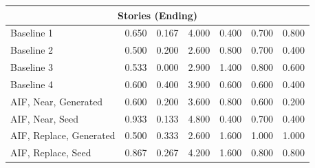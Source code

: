 \begin{table}[!t]
\begin{tabular}{lcccccc}
\midrule
\multicolumn{7}{c}{Stories (Ending)} \\
\midrule
Baseline 1 & 0.650 & 0.167 & 4.000 & 0.400 & 0.700 & 0.800  \\ 
Baseline 2 & 0.500 & 0.200 & 2.600 & 0.800 & 0.700 & 0.400  \\ 
Baseline 3 & 0.533 & 0.000 & 2.900 & 1.400 & 0.800 & 0.600  \\ 
Baseline 4 & 0.600 & 0.400 & 3.900 & 0.600 & 0.600 & 0.400  \\ 
AIF, Near, Generated & 0.600 & 0.200 & 3.600 & 0.800 & 0.600 & 0.200  \\ 
AIF, Near, Seed & 0.933 & 0.133 & 4.800 & 0.400 & 0.700 & 0.400  \\ 
AIF, Replace, Generated & 0.500 & 0.333 & 2.600 & 1.600 & 1.000 & 1.000  \\ 
AIF, Replace, Seed & 0.867 & 0.267 & 4.200 & 1.600 & 0.800 & 0.800 \\ 
\bottomrule
\end{tabular}
\end{table}